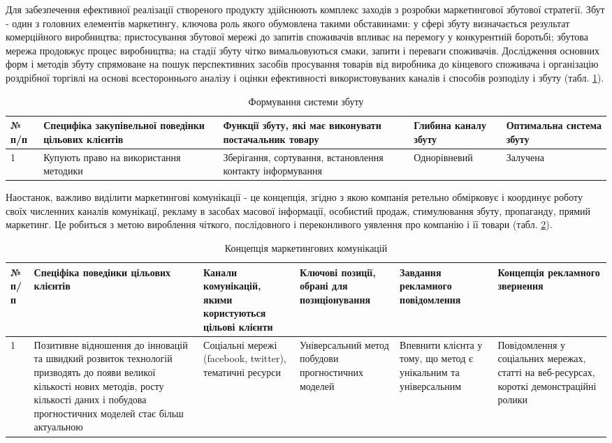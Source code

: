 Для забезпечення ефективної реалізації створеного продукту здійснюють комплекс заходів з розробки маркетингової збутової стратегії. Збут - один з головних елементів маркетингу, ключова роль якого обумовлена такими обставинами: у сфері збуту визначається результат комерційного виробництва; пристосування збутової мережі до запитів споживачів впливає на перемогу у конкурентній боротьбі; збутова мережа продовжує процес виробництва; на стадії збуту чітко вимальовуються смаки, запити і переваги споживачів. Дослідження основних форм і методів збуту спрямоване на пошук перспективних засобів просування товарів від виробника до кінцевого споживача і організацію роздрібної торгівлі на основі всестороннього аналізу і оцінки ефективності використовуваних каналів і способів розподілу і збуту (табл. \ref{tab:stab_16}).

\begin{table}[H]
\fontsize{12pt}{12pt}\selectfont
	\begin{tabularx}{\textwidth}{|l|X|X|X|X|}
    \hline
    № п/п & Специфіка закупівельної поведінки цільових клієнтів & Функції збуту, які має виконувати постачальник товару & Глибина каналу збуту & Оптимальна система збуту \\ \hline
    1 & Купують право на використання методики & Зберігання, сортування, встановлення контакту інформування & Однорівневий & Залучена \\
    \hline
    \end{tabularx}
\caption{Формування системи збуту} \label{tab:stab_16}
\end{table}

Наостанок, важливо виділити маркетингові комунікації - це концепція, згідно з якою компанія ретельно обмірковує і координує роботу своїх численних каналів комунікацї, рекламу в засобах масової інформації, особистий продаж, стимулювання збуту, пропаганду, прямий маркетинг. Це робиться з метою вироблення чіткого, послідовного і переконливого уявлення про компанію і її товари (табл. \ref{tab:stab_17}).

\begin{table}[H]
\fontsize{12pt}{12pt}\selectfont
	\begin{tabularx}{\textwidth}{|l|X|X|X|X|X|}
    \hline
    № п/п & Спеціфіка поведінки цільових клієнтів & Канали комунікацій, якими користуються цільові клієнти & Ключові позиції, обрані для позиціонування & Завдання рекламного повідомлення & Концепція рекламного звернення \\ \hline
    1 & Позитивне відношення до інновацій та швидкий розвиток технологій призводять до появи великої кількості нових методів, росту кількості даних і побудова прогностичних моделей стає більш актуальною & Соціальні мережі (facebook, twitter), тематичні ресурси & Універсальний метод побудови прогностичних моделей & Впевнити клієнта у тому, що метод є унікальним та універсальним & Повідомлення у соціальних мережах, статті на веб-ресурсах, короткі демонстраційні ролики \\
    \hline
    \end{tabularx}
\caption{Концепція маркетингових комунікацій} \label{tab:stab_17}
\end{table}

